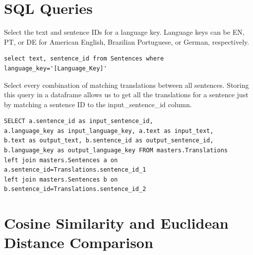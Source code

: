 \documentclass[runningheads]{llncs}
\begin{document}
\section{SQL Queries}
Select the text and sentence IDs for a language key. Language keys can be EN, PT, or DE for American English, Brazilian Portuguese, or German, respectively. 

\begin{verbatim}
select text, sentence_id from Sentences where language_key='[Language_Key]'
\end{verbatim}
Select every combination of matching translations between all sentences. Storing this query in a dataframe allows us to get all the translations for a sentence just by matching a sentence ID to the input\_sentence\_id column.

\begin{verbatim}
SELECT a.sentence_id as input_sentence_id, 
a.language_key as input_language_key, a.text as input_text, 
b.text as output_text, b.sentence_id as output_sentence_id, 
b.language_key as output_language_key FROM masters.Translations 
left join masters.Sentences a on a.sentence_id=Translations.sentence_id_1 
left join masters.Sentences b on b.sentence_id=Translations.sentence_id_2
\end{verbatim}

\section{Cosine Similarity and Euclidean Distance Comparison}
\hypertarget{Appendix C}{}
\end{document}
